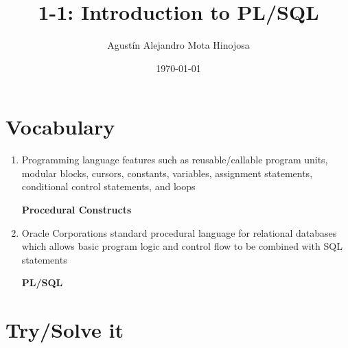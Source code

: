 \documentclass[11pt]{article}
\author{Agustín Alejandro Mota Hinojosa}
\date{\today}
\title{1-1: Introduction to PL/SQL}
\begin{document}
\maketitle
\tableofcontents

\section*{Vocabulary}
\label{sec:orgfceb6bb}
\begin{enumerate}
\item Programming language features such as reusable/callable program units,
modular blocks, cursors, constants, variables, assignment statements,
conditional control statements, and loops

\textbf{Procedural Constructs}

\item Oracle Corporations standard procedural language for relational databases
which allows basic program logic and control flow to be combined with SQL
statements

\textbf{PL/SQL}
\end{enumerate}
\section*{Try/Solve it}
\label{sec:orgdd28264}
\end{document}
